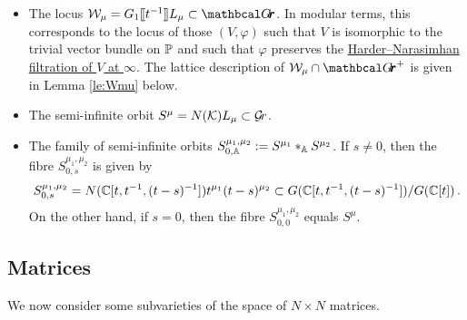 \documentclass[draft]{article}
\begin{document}
\begin{itemize}
    \item The locus $\cW_\mu = G_1\xt[t^{-1}]L_\mu \subset \Grth $.  
    In modular terms, this corresponds to the locus of those $ (V, \varphi)$ such that $ V $ is isomorphic to the trivial vector bundle on $ \PP$ and such that $ \varphi$ preserves the \ul{Harder--Narasimhan filtration of $V$ at $ \infty$}.  The lattice description of $ \cW_\mu \cap \Grth^+$ is given in Lemma \ref{le:Wmu} below.  
    
    \item The semi-infinite orbit $ S^\mu = N(\cK)L_\mu \subset \Gr $.  
    \item The family of semi-infinite orbits $ S^{\mu_1, \mu_2}_{0,\AA} := S^{\mu_1} \ast_\AA S^{\mu_2}$.  If $ s \ne 0 $, then the fibre $S^{\mu_1, \mu_2}_{0,s} $ is given by
    $$
    S^{\mu_1, \mu_2}_{0,s} = N(\CC[t, t^{-1}, (t-s)^{-1}])t^{\mu_1} (t-s)^{\mu_2} \subset G(\CC[t,t^{-1}, (t-s)^{-1}]) / G(\CC[t]) \,. %
    $$
    On the other hand, if $ s = 0$, then the fibre $S^{\mu_1, \mu_2}_{0,0} $ equals $ S^\mu$.
    
    
\end{itemize}

\subsection{Matrices}
We now consider some subvarieties of the space of $ N\times N$ matrices. 

\end{document}
